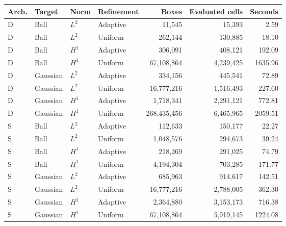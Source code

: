 \begin{longtable}{@{}llllrrr@{}}
\toprule
Arch. & Target & Norm & Refinement & Boxes & Evaluated cells & Seconds \\
\midrule
\endhead
D & Ball & $L^2$ & Adaptive & 11,545 & 15,393 & 2.59 \\
D & Ball & $L^2$ & Uniform & 262,144 & 130,885 & 18.10 \\
D & Ball & $H^1$ & Adaptive & 306,091 & 408,121 & 192.09 \\
D & Ball & $H^1$ & Uniform & 67,108,864 & 4,239,425 & 1635.96 \\
D & Gaussian & $L^2$ & Adaptive & 334,156 & 445,541 & 72.89 \\
D & Gaussian & $L^2$ & Uniform & 16,777,216 & 1,516,493 & 227.60 \\
D & Gaussian & $H^1$ & Adaptive & 1,718,341 & 2,291,121 & 772.81 \\
D & Gaussian & $H^1$ & Uniform & 268,435,456 & 6,465,965 & 2059.51 \\
S & Ball & $L^2$ & Adaptive & 112,633 & 150,177 & 22.27 \\
S & Ball & $L^2$ & Uniform & 1,048,576 & 294,673 & 39.24 \\
S & Ball & $H^1$ & Adaptive & 218,269 & 291,025 & 74.79 \\
S & Ball & $H^1$ & Uniform & 4,194,304 & 703,285 & 171.77 \\
S & Gaussian & $L^2$ & Adaptive & 685,963 & 914,617 & 142.51 \\
S & Gaussian & $L^2$ & Uniform & 16,777,216 & 2,788,005 & 362.30 \\
S & Gaussian & $H^1$ & Adaptive & 2,364,880 & 3,153,173 & 716.38 \\
S & Gaussian & $H^1$ & Uniform & 67,108,864 & 5,919,145 & 1224.08 \\
\bottomrule
\end{longtable}

